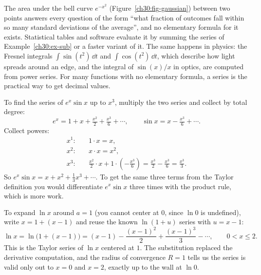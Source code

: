 \begin{applicationbox}
The area under the bell curve $e^{-x^2}$ (Figure~\ref{ch30:fig-gaussian}) between two points answers every question of the form ``what fraction of outcomes fall within so many standard deviations of the average'', and no elementary formula for it exists. Statistical tables and software evaluate it by summing the series of Example~\ref{ch30:ex-sub} or a faster variant of it. The same happens in physics: the Fresnel integrals $\int \sin(t^2)\,\dd t$ and $\int \cos(t^2)\,\dd t$, which describe how light spreads around an edge, and the integral of $\sin(x)/x$ in optics, are computed from power series. For many functions with no elementary formula, a series is the practical way to get decimal values.
\end{applicationbox}

\begin{example}
\label{ch30:ex-mult}
To find the series of $e^x \sin x$ up to $x^3$, multiply the two series and collect by total degree:
\[
  e^x = 1 + x + \tfrac{x^2}{2} + \tfrac{x^3}{6} + \cdots,
  \qquad
  \sin x = x - \tfrac{x^3}{6} + \cdots.
\]
Collect powers:
\[
\begin{aligned}
  x^1:&\quad 1\cdot x = x,\\
  x^2:&\quad x\cdot x = x^2,\\
  x^3:&\quad \tfrac{x^2}{2}\cdot x + 1\cdot\left(-\tfrac{x^3}{6}\right) = \tfrac{x^3}{2} - \tfrac{x^3}{6} = \tfrac{x^3}{3}.
\end{aligned}
\]
So $e^x \sin x = x + x^2 + \tfrac{1}{3}x^3 + \cdots$. To get the same three terms from the Taylor definition you would differentiate $e^x \sin x$ three times with the product rule, which is more work.
\end{example}

\begin{example}
\label{ch30:ex-shift}
To expand $\ln x$ around $a = 1$ (you cannot center at $0$, since $\ln 0$ is undefined), write $x = 1 + (x-1)$ and reuse the known $\ln(1+u)$ series with $u = x-1$:
\[
  \ln x = \ln\bigl(1 + (x-1)\bigr)
  = (x-1) - \frac{(x-1)^2}{2} + \frac{(x-1)^3}{3} - \cdots,
  \qquad 0 < x \le 2.
\]
This is the Taylor series of $\ln x$ centered at $1$. The substitution replaced the derivative computation, and the radius of convergence $R=1$ tells us the series is valid only out to $x=0$ and $x=2$, exactly up to the wall at $\ln 0$.
\end{example}

